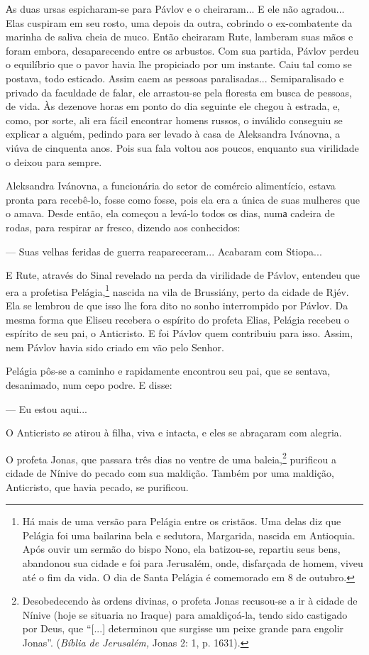Аs duas ursas espicharam-se para Pávlov e o cheiraram... E ele não
agradou... Elas cuspiram em seu rosto, uma depois da outra, cobrindo o
ex-combatente da marinha de saliva cheia de muco. Então cheiraram Rute,
lamberam suas mãos e foram embora, desaparecendo entre os arbustos. Com
sua partida, Pávlov perdeu o equilíbrio que o pavor havia lhe propiciado
por um instante. Caiu tal como se postava, todo esticado. Assim caem as
pessoas paralisadas... Semiparalisado e privado da faculdade de falar,
ele arrastou-se pela floresta em busca de pessoas, de vida. Às dezenove
horas em ponto do dia seguinte ele chegou à estrada, e, como, por sorte,
ali era fácil encontrar homens russos, o inválido conseguiu se explicar
a alguém, pedindo para ser levado à casa de Aleksandra Ivánovna, a viúva
de cinquenta anos. Pois sua fala voltou aos poucos, enquanto sua
virilidade o deixou para sempre.

Aleksandra Ivánovna, a funcionária do setor de comércio alimentício,
estava pronta para recebê-lo, fosse como fosse, pois ela era a única de
suas mulheres que o amava. Desde então, ela começou a levá-lo todos os
dias, numа cadeira de rodas, para respirar ar fresco, dizendo aos
conhecidos:

--- Suas velhas feridas de guerra reapareceram... Acabaram com Stiopa...

E Rute, através do Sinal revelado na perda da virilidade de Pávlov,
entendeu que era a profetisa Pelágia,\footnote{Há mais de uma versão
  para Pelágia entre os cristãos. Uma delas diz que Pelágia foi uma
  bailarina bela e sedutora, Margarida, nascida em Antioquia. Após ouvir
  um sermão do bispo Nono, ela batizou-se, repartiu seus bens, abandonou
  sua cidade e foi para Jerusalém, onde, disfarçada de homem, viveu até
  o fim da vida. O dia de Santa Pelágia é comemorado em 8 de outubro.}
nascida na vila de Brussiány, perto da cidade de Rjév. Ela se lembrou de
que isso lhe fora dito no sonho interrompido por Pávlov. Da mesma forma
que Eliseu recebera o espírito do profeta Elias, Pelágia recebeu o
espírito de seu pai, o Anticristo. E foi Pávlov quem contribuiu para
isso. Assim, nem Pávlov havia sido criado em vão pelo Senhor.

Pelágia pôs-se a caminho e rapidamente encontrou seu pai, que se
sentava, desanimado, num cepo podre. E disse:

--- Eu estou aqui...

O Anticristo se atirou à filha, viva e intacta, e eles se abraçaram com
alegria.

O profeta Jonas, que passara três dias no ventre de uma
baleia,\footnote{Desobedecendo às ordens divinas, o profeta Jonas
  recusou-se a ir à cidade de Nínive (hoje se situaria no Iraque) para
  amaldiçoá-la, tendo sido castigado por Deus, que ``{[}...{]}
  determinou que surgisse um peixe grande para engolir Jonas''.
  (\emph{Bíblia de Jerusalém,} Jonas 2: 1, p. 1631).} purificou a cidade
de Nínive do pecado com sua maldição. Também por uma maldição,
Anticristo, que havia pecado, se purificou.

